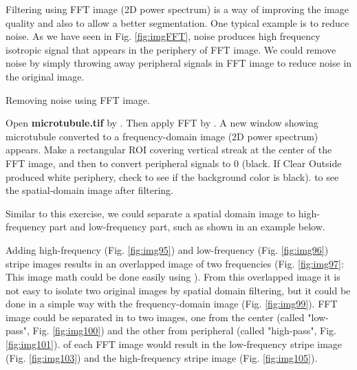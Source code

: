 Filtering using FFT image (2D power spectrum) is a way of improving the image quality and
also to allow a better segmentation. One typical example is to reduce noise. As we have seen in Fig. \ref{fig:imgFFT}, noise produces high frequency
isotropic signal that appears in the periphery of FFT image. We
could remove noise by simply throwing away peripheral signals in FFT
image to reduce noise in the original image. 

\begin{indentexercise}{1} Removing noise using FFT image. 

Open \textbf{microtubule.tif} by . Then apply FFT
by . A new
window showing microtubule converted to a frequency-domain image (2D power spectrum) appears. Make
a rectangular ROI covering vertical streak at the center of the FFT
image, and then  to
convert peripheral signals to 0 (black. If Clear Outside produced white
periphery, check  to
see if the background color is black).  to see the spatial-domain image after
filtering.
\end{indentexercise}

Similar to this exercise, we could separate a spatial domain image to high-frequency part
and low-frequency part, such as shown
in an example below.
 
Adding high-frequency (Fig. \ref{fig:img95}) and low-frequency (Fig. \ref{fig:img96}) stripe images 
results in an overlapped image of two frequencies (Fig. \ref{fig:img97}: This image math could be done
easily using  ). From this overlapped image it is not easy
to isolate two original images by spatial domain filtering, but
it could be done in a simple way with the frequency-domain image (Fig. \ref{fig:img99}). 
FFT image could be separated in to two images, one from the center (called "low-pass", Fig. \ref{fig:img100}) 
and the other from peripheral (called "high-pass",  Fig. \ref{fig:img101}). 
 of each FFT image would result in the low-frequency stripe image  (Fig. \ref{fig:img103}) and
the high-frequency stripe image (Fig. \ref{fig:img105}).

